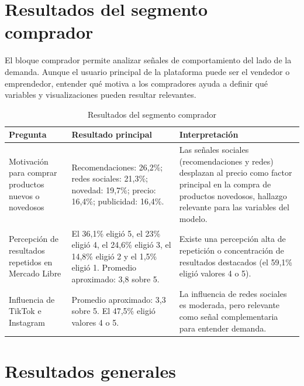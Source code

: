 \section{Resultados del segmento comprador}

El bloque comprador permite analizar señales de comportamiento del lado de la demanda. Aunque el usuario principal de la plataforma puede ser el vendedor o emprendedor, entender qué motiva a los compradores ayuda a definir qué variables y visualizaciones pueden resultar relevantes.

\begin{table}[ht]
	\centering
	\caption{Resultados del segmento comprador}
	\label{tab:resultados-comprador}
	\begin{tabularx}{\textwidth}{@{}>{\raggedright\arraybackslash}p{3.8cm} >{\raggedright\arraybackslash}p{5.5cm} X@{}}
		\toprule
		\textbf{Pregunta} & \textbf{Resultado principal} & \textbf{Interpretación} \\
		\midrule
		Motivación para comprar productos nuevos o novedosos & Recomendaciones: 26,2\%; redes sociales: 21,3\%; novedad: 19,7\%; precio: 16,4\%; publicidad: 16,4\%. & Las señales sociales (recomendaciones y redes) desplazan al precio como factor principal en la compra de productos novedosos, hallazgo relevante para las variables del modelo. \\
		Percepción de resultados repetidos en Mercado Libre & El 36,1\% eligió 5, el 23\% eligió 4, el 24,6\% eligió 3, el 14,8\% eligió 2 y el 1,5\% eligió 1. Promedio aproximado: 3,8 sobre 5. & Existe una percepción alta de repetición o concentración de resultados destacados (el 59,1\% eligió valores 4 o 5). \\
		Influencia de TikTok e Instagram & Promedio aproximado: 3,3 sobre 5. El 47,5\% eligió valores 4 o 5. & La influencia de redes sociales es moderada, pero relevante como señal complementaria para entender demanda. \\
		\bottomrule
	\end{tabularx}
\end{table}

\section{Resultados generales}

